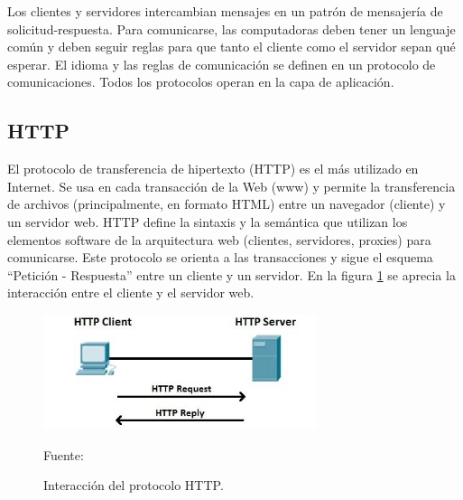

Los clientes y servidores intercambian mensajes en un patrón de mensajería de solicitud-respuesta. Para comunicarse, las computadoras deben tener un lenguaje común y deben seguir reglas para que tanto el cliente como el servidor sepan qué esperar. El idioma y las reglas de comunicación se definen en un protocolo de comunicaciones. Todos los protocolos operan en la capa de aplicación.\\

\subsection{HTTP}
El protocolo de transferencia de hipertexto (HTTP) es el más utilizado en Internet. Se usa en cada transacción de la Web (www) y permite la transferencia de archivos (principalmente, en formato HTML) entre un navegador (cliente) y un servidor web. HTTP define la sintaxis y la semántica que utilizan los elementos software de la arquitectura web (clientes, servidores, proxies) para comunicarse. Este protocolo se orienta a las transacciones y sigue el esquema ``Petición - Respuesta'' entre un cliente y un servidor. En la figura \ref{fig:http} se aprecia la interacción entre el cliente y el servidor web.

\begin{figure}[H]
    \begin{center}
        \includegraphics[width=8cm]{img/capitulo_2/http1.jpg}
        \caption{Interacción del protocolo HTTP.\\}
        Fuente: \cite{http}
        \label{fig:http}
    \end{center}
\end{figure}

